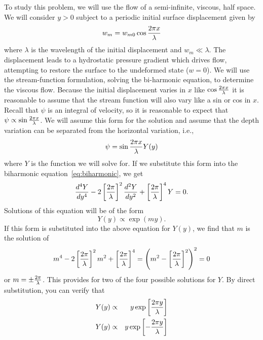 \documentclass[12pt,twoside]{article}
\begin{document}
To study this problem, we will use the flow of a semi-infinite, viscous, half
space.  We will consider $y > 0$ subject to a periodic initial surface
displacement given by
\begin{equation}
w_m = w_{m0} \cos {{2 \pi x}\over{\lambda}}
\end{equation}
where $\lambda$ is the wavelength of the initial displacement and $w_m \ll
\lambda$.   The displacement leads to a hydrostatic pressure gradient which
drives flow, attempting to restore the surface to the undeformed state ($w =
0$).   We will use the stream-function formulation, solving the bi-harmonic
equation, to determine the viscous flow.   Because the initial displacement
varies in $x$ like $\cos {{2 \pi x}\over{\lambda}}$ it is reasonable to assume
that the stream function will also vary like a sin or cos in $x$.  Recall that
$\psi$ is an integral of velocity, so it is reasonable to expect that $\psi
\propto \sin {{2 \pi x}\over{\lambda}}$.  We will assume this form for the
solution and assume that the depth variation can be separated from the
horizontal variation, i.e.,
\begin{equation} 
\psi = \sin {{2 \pi x}\over{\lambda}} Y(y)
\end{equation}
where $Y$ is the function we will solve for.   If we substitute this form into
the biharmonic equation~\ref{eq:biharmonic}, we get
\begin{equation}
\frac{d^4 Y}{dy^4} - 2 \left [ {{2 \pi}\over{\lambda}} \right ]^2 
\frac{d^2 Y}{dy^2} + \left [ {{2 \pi}\over{\lambda}} \right ]^4 Y = 0.
\label{eq:forth-order-eq}
\end{equation}
Solutions of this equation will be of the form 
\begin{equation}
Y(y) \propto \exp (my).
\end{equation}
If this form is substituted into the above equation for $Y(y)$, we find that
$m$ is the solution of
\begin{equation}
m^4 - 2 \left [ {{2 \pi}\over{\lambda}} \right ]^2 m^2 + \left [ {{2
\pi}\over{\lambda}} \right ]^4 = \left ( m^2 -\left [ {{2 \pi}\over{\lambda}}
\right ]^2 \right )^2 = 0
\end{equation}
or $m = \pm {{2 \pi}\over{\lambda}}$.   This provides for two of the four
possible solutions for $Y$.   By direct substitution, you can verify that
\begin{eqnarray}
Y(y) & \propto & y \exp \left [ {{2 \pi y}\over{\lambda}} \right ] \\
Y(y) & \propto & y \exp \left [ -{{2 \pi y}\over{\lambda}} \right ]
\end{eqnarray}
\end{document}
